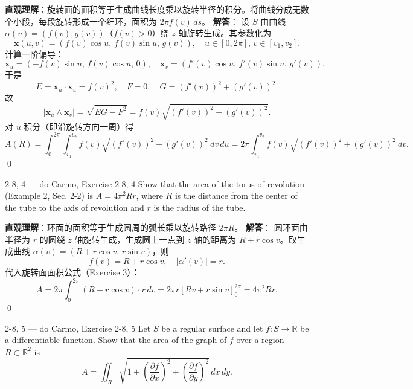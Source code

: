 \begin{solution}
\textbf{直观理解}：旋转面的面积等于生成曲线长度乘以旋转半径的积分。将曲线分成无数个小段，每段旋转形成一个细环，面积为 $2\pi f(v) \, ds$。
\textbf{解答}：
设 $S$ 由曲线 $\alpha(v) = (f(v), g(v))$（$f(v) > 0$）绕 $z$ 轴旋转生成。其参数化为
\[
\mathbf{x}(u, v) = (f(v)\cos u, \, f(v)\sin u, \, g(v)), \quad u \in [0, 2\pi], \, v \in [v_1, v_2].
\]
计算一阶偏导：
\[
\mathbf{x}_u = (-f(v)\sin u, \, f(v)\cos u, \, 0), \quad \mathbf{x}_v = (f'(v)\cos u, \, f'(v)\sin u, \, g'(v)).
\]
于是
\[
E = \mathbf{x}_u \cdot \mathbf{x}_u = f(v)^2, \quad F = 0, \quad G = (f'(v))^2 + (g'(v))^2.
\]
故
\[
|\mathbf{x}_u \wedge \mathbf{x}_v| = \sqrt{EG - F^2} = f(v)\sqrt{(f'(v))^2 + (g'(v))^2}.
\]
对 $u$ 积分（即沿旋转方向一周）得
\[
A(R) = \int_0^{2\pi} \int_{v_1}^{v_2} f(v)\sqrt{(f'(v))^2 + (g'(v))^2} \, dv \, du = 2\pi \int_{v_1}^{v_2} f(v) \sqrt{(f'(v))^2 + (g'(v))^2} \, dv.
\]
\qed
\end{solution}
\begin{exercise}
{2-8, 4 — do Carmo, Exercise 2-8, 4}
Show that the area of the torus of revolution (Example 2, Sec. 2-2) is $A = 4\pi^2 R r$, where $R$ is the distance from the center of the tube to the axis of revolution and $r$ is the radius of the tube.


\end{exercise}

\begin{solution}
\textbf{直观理解}：环面的面积等于生成圆周的弧长乘以旋转路径 $2\pi R$。
\textbf{解答}：
圆环面由半径为 $r$ 的圆绕 $z$ 轴旋转生成，生成圆上一点到 $z$ 轴的距离为 $R + r\cos v$。取生成曲线 $\alpha(v) = (R + r\cos v, \, r\sin v)$，则
\[
f(v) = R + r\cos v, \quad |\alpha'(v)| = r.
\]
代入旋转面面积公式（Exercise 3）：
\[
A = 2\pi \int_0^{2\pi} (R + r\cos v) \cdot r \, dv = 2\pi r \left[ R v + r\sin v \right]_0^{2\pi} = 4\pi^2 R r.
\]
\qed
\end{solution}
\begin{exercise}
{2-8, 5 — do Carmo, Exercise 2-8, 5}
Let $S$ be a regular surface and let $f: S \to \mathbb{R}$ be a differentiable function. Show that the area of the graph of $f$ over a region $R \subset \mathbb{R}^2$ is
\[
A = \iint_R \sqrt{1 + \left(\frac{\partial f}{\partial x}\right)^2 + \left(\frac{\partial f}{\partial y}\right)^2} \, dx \, dy.
\]


\end{exercise}

